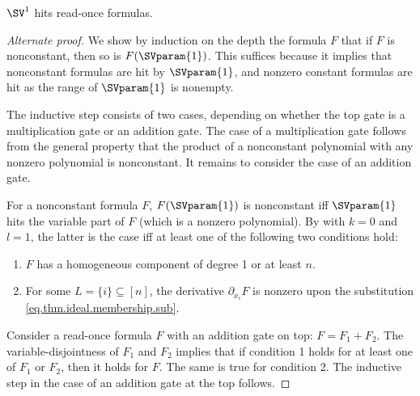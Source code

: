 \begin{theorem}
    \label{thm.rof}
    $\SV^1$ hits read-once formulas.
\end{theorem}

\begin{proof}[Alternate proof]
We show by induction on the depth the formula $F$ that if $F$ is nonconstant, then so is $F(\SVparam{1})$. This suffices because it implies that nonconstant formulas are hit by $\SVparam{1}$, and nonzero constant formulas are hit as the range of $\SVparam{1}$ is nonempty.

The inductive step consists of two cases, depending on whether
the top gate is a multiplication gate or an addition gate. The case of a multiplication gate follows from the general property that the product of a nonconstant polynomial with any nonzero polynomial is nonconstant. It remains to consider the case of an addition gate.

For a nonconstant formula $F$, $F(\SVparam{1})$ is nonconstant iff $\SVparam{1}$ hits the variable part of $F$ (which is a nonzero polynomial). By  with $k=0$ and $l=1$, the latter is the case iff at least one of the following two conditions hold:
\begin{enumerate}
\item $F$ has a homogeneous component of degree 1 or at least $n$.
\item For some $L = \{i\} \subseteq [n]$, the derivative $\partial_{x_i} F$ is nonzero upon the substitution \eqref{eq.thm.ideal.membership.sub}.
\end{enumerate}
Consider a read-once formula $F$ with an addition gate on top: $F = F_1 + F_2$. The variable-disjointness of $F_1$ and $F_2$ implies that if condition 1 holds for at least one of $F_1$ or $F_2$, then it holds for $F$. The same is true for condition 2. The inductive step in the case of an addition gate at the top follows. 
\end{proof}

